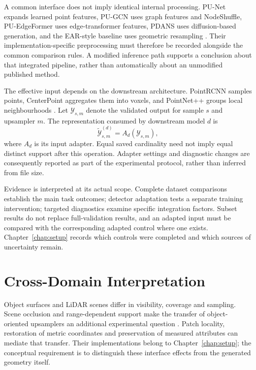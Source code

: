 A common interface does not imply identical internal processing.
PU-Net expands learned point features, PU-GCN uses graph features and
NodeShuffle, PU-EdgeFormer uses edge-transformer features, PDANS uses
diffusion-based generation, and the EAR-style baseline uses geometric
resampling
\cite{yu2018punet,qian2021pugcn,kim2023puedgeformer,zhang2025pdans,huang2013ear}.
Their implementation-specific preprocessing must therefore be recorded
alongside the common comparison rules. A modified inference path supports
a conclusion about that integrated pipeline, rather than automatically
about an unmodified published method.

The effective input depends on the downstream architecture. PointRCNN
samples points, CenterPoint aggregates them into voxels, and PointNet++
groups local neighbourhoods
\cite{shi2019pointrcnn,yin2021centerpoint,qi2017pointnetpp}. Let
$\mathcal Y_{s,m}$ denote the validated output for sample $s$ and
upsampler $m$. The representation consumed by downstream model $d$ is
\begin{equation}
\widetilde{\mathcal Y}^{(d)}_{s,m}=A_d(\mathcal Y_{s,m}),
\label{eq:fc-3-8}
\end{equation}
where $A_d$ is its input adapter. Equal saved cardinality need not imply
equal distinct support after this operation. Adapter settings and
diagnostic changes are consequently reported as part of the experimental
protocol, rather than inferred from file size.

Evidence is interpreted at its actual scope. Complete dataset comparisons
establish the main task outcomes; detector adaptation tests a separate
training intervention; targeted diagnostics examine specific integration
factors. Subset results do not replace full-validation results, and an
adapted input must be compared with the corresponding adapted control
where one exists. Chapter~\ref{chap:setup} records which controls were
completed and which sources of uncertainty remain.

\section{Cross-Domain Interpretation}
\label{sec:fc-3-5}
\label{sec:fc-3-7}

Object surfaces and LiDAR scenes differ in visibility, coverage and
sampling. Scene occlusion and range-dependent support
\cite{geiger2013kitti} make the transfer of object-oriented upsamplers
an additional experimental question
\cite{yu2018punet,qian2021pugcn,kim2023puedgeformer,zhang2025pdans}.
Patch locality, restoration of metric coordinates and preservation of
measured attributes can mediate that transfer. Their implementations
belong to Chapter~\ref{chap:setup}; the conceptual requirement is to
distinguish these interface effects from the generated geometry itself.

